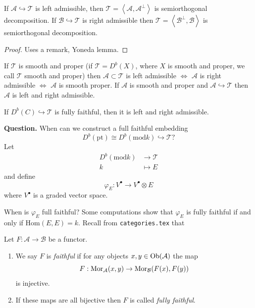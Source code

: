 \begin{lemma}
\label{dcos-label-023}
If $\mathcal{A} \hookrightarrow  \mathcal{T}$
is left admissible, then
$\mathcal{T}=\left\langle{}\mathcal{A},\mathcal{A}
^\perp\right\rangle{}$
is semiorthogonal decomposition. If
$\mathcal{B} \hookrightarrow  \mathcal{T}$ is
right admissible then
$\mathcal{T}=\left\langle{}\mathcal{B}^\perp,
\mathcal{B}\right\rangle{}$ is semiorthogonal
decomposition.
\end{lemma}

\begin{proof}
Uses a remark, Yoneda lemma.
\end{proof}

\begin{proposition}
\label{proposition-Bondall-Van-der-Borgh}
If $\mathcal{T}$ is smooth and proper (if
$\mathcal{T}=D^b(X)$, where $X$ is smooth and
proper, we call $\mathcal{T}$ smooth and
proper) then $\mathcal{A} \subset
\mathcal{T}$ is left admissible $\iff$
$\mathcal{A}$ is right admissible $\iff$
$\mathcal{A}$ is smooth proper. If
$\mathcal{A}$ is smooth and proper and
$\mathcal{A} \hookrightarrow  \mathcal{T}$
then $\mathcal{A}$ is left and right
admissible.
\end{proposition}

\medskip\noindent
If $D^b(C) \hookrightarrow  \mathcal{T}$ is
fully faithful, then it is left and right
admissible.

{\bf Question.} When can we construct a full
faithful embedding
$$
D^b(\text{pt})\cong D^b(\text{mod}k)
\hookrightarrow  \mathcal{T}?
$$
Let $$
\begin{aligned} D^b(\text{mod}k)
&\longrightarrow \mathcal{T} \\ k
&\longmapsto E
\end{aligned}
$$
and define
$$
\varphi_E:V^\bullet \to V^\bullet \otimes E
$$
where $V^\bullet$ is a graded vector space.

When is $\varphi_E$ full faithful? Some
computations show that $\varphi_E$ is fully
faithful if and only if $\text{Hom}(E,E)=k$.
Recall from
\texttt{categories.tex} that

\begin{definition}
\label{definition-faithful}
Let $F : \mathcal{A} \to \mathcal{B}$ be a
functor.
\begin{enumerate}
\item We say $F$ is {\it faithful} if
for any objects $x, y \in \mathop{\mathrm{Ob}}\nolimits(\mathcal{A})$
the map
$$
F : \mathop{\mathrm{Mor}}\nolimits_\mathcal{A}(x, y) \to
\mathop{\mathrm{Mor}}\nolimits_\mathcal{B}(F(x), F(y))
$$
is injective.
\item If these maps are all bijective then
$F$ is called
{\it fully faithful}.
\end{enumerate}
\end{definition}

